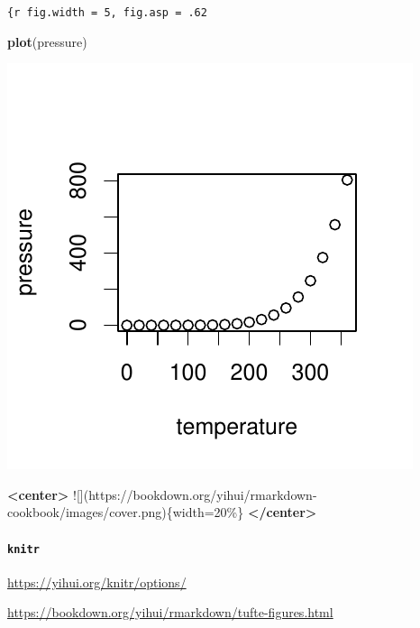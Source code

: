 \documentclass[
]{book}
\newenvironment{Shaded}{\begin{snugshade}}{\end{snugshade}}
\newcommand{\AlertTok}[1]{\textcolor[rgb]{0.94,0.16,0.16}{#1}}
\newcommand{\FunctionTok}[1]{\textcolor[rgb]{0.13,0.29,0.53}{\textbf{#1}}}
\newcommand{\KeywordTok}[1]{\textcolor[rgb]{0.13,0.29,0.53}{\textbf{#1}}}
\newcommand{\NormalTok}[1]{#1}
\theoremstyle{definition}
\theoremstyle{definition}
\theoremstyle{definition}
\theoremstyle{definition}
\theoremstyle{remark}
\begin{document}
\texttt{\{r\ fig.width\ =\ 5,\ fig.asp\ =\ .62}

\begin{Shaded}
\begin{Highlighting}[]
\FunctionTok{plot}\NormalTok{(pressure)}
\end{Highlighting}
\end{Shaded}

\begin{center}\includegraphics{202401280001-test_files/figure-latex/unnamed-chunk-6-1} \end{center}

\begin{Shaded}
\begin{Highlighting}[]
\KeywordTok{\textless{}center\textgreater{}}
\AlertTok{![](https://bookdown.org/yihui/rmarkdown{-}cookbook/images/cover.png)}\NormalTok{\{width=20\%\}}
\KeywordTok{\textless{}/center\textgreater{}}
\end{Highlighting}
\end{Shaded}

\hypertarget{knitr}{%
\paragraph{\texorpdfstring{\texttt{knitr}}{knitr}}\label{knitr}}

\url{https://yihui.org/knitr/options/}

\url{https://bookdown.org/yihui/rmarkdown/tufte-figures.html}
\end{document}
